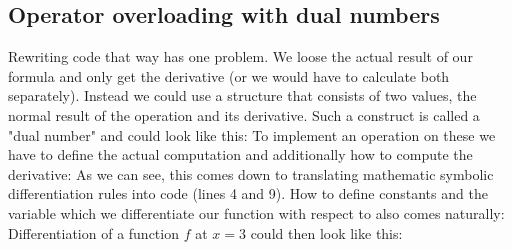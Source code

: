 \subsection{Operator overloading with dual numbers}
Rewriting code that way has one problem. We loose the actual result of our formula and only get the derivative (or we would have to calculate both separately). Instead we could use a structure that consists of two values, the normal result of the operation and its derivative. Such a construct is called a "dual number"  and could look like this:
To implement an operation on these we have to define the actual computation and additionally how to compute the derivative:
As we can see, this comes down to translating mathematic symbolic differentiation rules into code (lines 4 and 9). How to define constants and the variable which we differentiate our function with respect to \todogrammar also comes naturally:
Differentiation of a function $f$ at $x = 3$ could then look like this:


